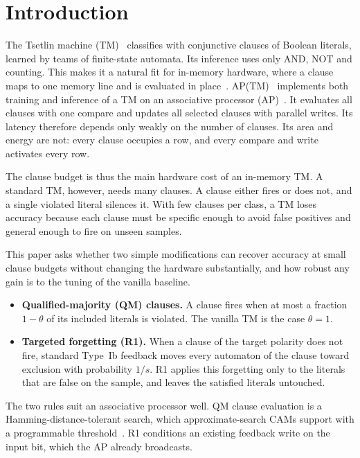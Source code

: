 \documentclass[preprint,12pt,times]{elsarticle}
\begin{document}
\section{Introduction}
\label{sec:intro}

The Tsetlin machine (TM)~\cite{granmo2018tm} classifies with conjunctive clauses of Boolean literals, learned by teams of finite-state automata.
Its inference uses only AND, NOT and counting.
This makes it a natural fit for in-memory hardware, where a clause maps to one memory line and is evaluated in place~\cite{ghazal2025impact,shrot2026aptm}.
AP(TM)~\cite{shrot2026aptm} implements both training and inference of a TM on an associative processor (AP)~\cite{yavits2015ap}.
It evaluates all clauses with one compare and updates all selected clauses with parallel writes.
Its latency therefore depends only weakly on the number of clauses.
Its area and energy are not: every clause occupies a row, and every compare and write activates every row.

The clause budget is thus the main hardware cost of an in-memory TM.
A standard TM, however, needs many clauses.
A clause either fires or does not, and a single violated literal silences it.
With few clauses per class, a TM loses accuracy because each clause must be specific enough to avoid false positives and general enough to fire on unseen samples.

This paper asks whether two simple modifications can recover accuracy at small clause budgets without changing the hardware substantially, and how robust any gain is to the tuning of the vanilla baseline.
\begin{itemize}
\item \textbf{Qualified-majority (QM) clauses.} A clause fires when at most a fraction $1-\theta$ of its included literals is violated. The vanilla TM is the case $\theta = 1$.
\item \textbf{Targeted forgetting (R1).} When a clause of the target polarity does not fire, standard Type~Ib feedback moves every automaton of the clause toward exclusion with probability $1/s$. R1 applies this forgetting only to the literals that are false on the sample, and leaves the satisfied literals untouched.
\end{itemize}

The two rules suit an associative processor well.
QM clause evaluation is a Hamming-distance-tolerant search, which approximate-search CAMs support with a programmable threshold~\cite{garzon2022hdcam,garzon2025jssc}.
R1 conditions an existing feedback write on the input bit, which the AP already broadcasts.
\end{document}
